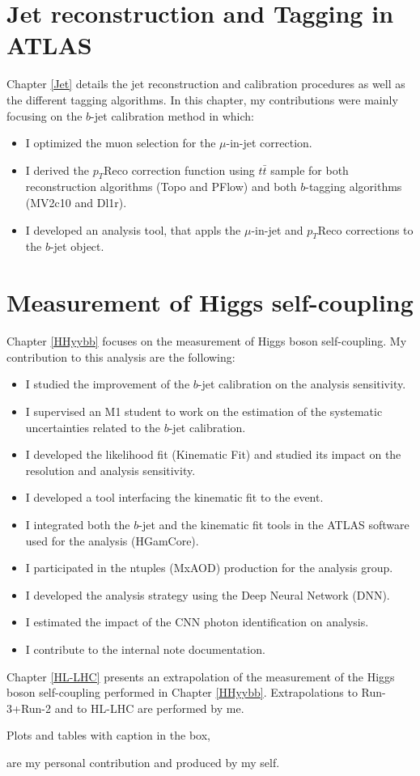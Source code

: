 \section*{Jet reconstruction and Tagging in ATLAS}
Chapter \ref{Jet} details the jet reconstruction and calibration procedures as well as the different tagging algorithms. In this chapter, my contributions were mainly focusing on the $b$-jet calibration method in which: 
\begin{itemize}
    \item I optimized the muon selection for the $\mu$-in-jet correction.
    \item I derived the $p_T$Reco correction function using $t\bar{t}$ sample for both reconstruction algorithms (Topo and PFlow) and both $b$-tagging algorithms (MV2c10 and Dl1r). 
    \item I developed an analysis tool, that appls the $\mu$-in-jet and $p_T$Reco corrections to the $b$-jet object.
\end{itemize}

\section*{Measurement of Higgs self-coupling}

Chapter \ref{HHyybb} focuses on the measurement of Higgs boson self-coupling. My contribution to this analysis are the following: 

\begin{itemize}
    \item I studied the improvement of the $b$-jet calibration on the analysis sensitivity.  
    \item I supervised an M1 student to work on the estimation of the systematic uncertainties related to the $b$-jet calibration. 
    \item I developed the likelihood fit (Kinematic Fit) and studied its impact on the \mbb resolution and analysis sensitivity. 
    \item I developed a tool interfacing the kinematic fit to the \bbyy event.
    \item I integrated both the $b$-jet and the kinematic fit tools in the ATLAS software used for the analysis (HGamCore).
    \item I participated in the ntuples (MxAOD) production for the analysis group.
    \item I developed the analysis strategy using the Deep Neural Network (DNN).
    \item I estimated the impact of the CNN photon identification on \HHyybb analysis.
    \item I contribute to the internal note documentation.
\end{itemize}

Chapter \ref{HL-LHC} presents an extrapolation of the measurement of the Higgs boson self-coupling performed in Chapter \ref{HHyybb}. Extrapolations to Run-3+Run-2 and to HL-LHC are performed by me.

Plots and tables with caption in the box,
\begin{tcolorbox}[colback=black!5!white,colframe=white!75!black]
\end{tcolorbox}
are my personal contribution and produced by my self.